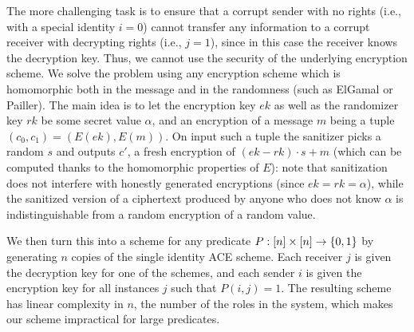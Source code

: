 \documentclass{llncs}
\begin{document}
The more challenging task is to ensure that a corrupt sender with no rights (i.e., with a special identity $i=0$) cannot transfer any information to a corrupt receiver with decrypting rights (i.e., $j=1$), since in this case the receiver knows the decryption key. Thus, we cannot use the security of the underlying encryption scheme. We solve the problem using any encryption scheme which is homomorphic both in the message and in the randomness (such as ElGamal or Pailler). The main idea is to let the encryption key $ek$ as well as the randomizer key $rk$ be some secret value $\alpha$, and an encryption of a message $m$ being a tuple $(c_0,c_1)=(E(ek),E(m))$. On input such a tuple the sanitizer picks a random $s$ and outputs $c'$, a fresh encryption of $(ek-rk)\cdot s +m$ (which can be computed thanks to the homomorphic properties of $E$): note that sanitization does not interfere with honestly generated encryptions (since $ek=rk=\alpha$), while the sanitized version of a ciphertext produced by anyone who does not know $\alpha$ is indistinguishable from a random encryption of a random value. 

We then turn this into a scheme for any predicate $P : [n]\times[n] \to \{0,1\}$ by generating $n$ copies of the single identity ACE scheme. Each receiver $j$ is given the decryption key for one of the schemes, and each sender $i$ is given the encryption key for all instances $j$ such that $P(i,j)=1$. The resulting scheme has linear complexity in $n$, the number of the roles in the system, which makes our scheme impractical for large predicates.
\end{document}
